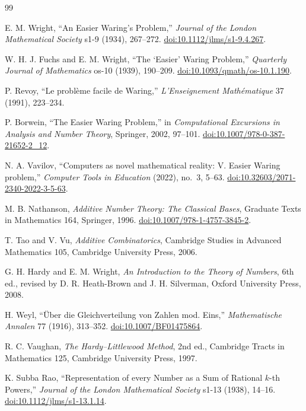 \documentclass[../Axiomathic.tex]{subfiles}
\begin{document}
\begin{thebibliography}{99}

E. M. Wright,
``An Easier Waring's Problem,''
\emph{Journal of the London Mathematical Society} s1-9 (1934), 267--272.
\href{https://doi.org/10.1112/jlms/s1-9.4.267}{doi:10.1112/jlms/s1-9.4.267}.

W. H. J. Fuchs and E. M. Wright,
``The `Easier' Waring Problem,''
\emph{Quarterly Journal of Mathematics} os-10 (1939), 190--209.
\href{https://doi.org/10.1093/qmath/os-10.1.190}{doi:10.1093/qmath/os-10.1.190}.

P. Revoy,
``Le probl\`eme facile de Waring,''
\emph{L'Enseignement Math\'ematique} 37 (1991), 223--234.

P. Borwein,
``The Easier Waring Problem,'' in
\emph{Computational Excursions in Analysis and Number Theory},
Springer, 2002, 97--101.
\href{https://doi.org/10.1007/978-0-387-21652-2_12}{doi:10.1007/978-0-387-21652-2\_12}.

N. A. Vavilov,
``Computers as novel mathematical reality: V. Easier Waring problem,''
\emph{Computer Tools in Education} (2022), no.~3, 5--63.
\href{https://doi.org/10.32603/2071-2340-2022-3-5-63}{doi:10.32603/2071-2340-2022-3-5-63}.

M. B. Nathanson,
\emph{Additive Number Theory: The Classical Bases},
Graduate Texts in Mathematics 164, Springer, 1996.
\href{https://doi.org/10.1007/978-1-4757-3845-2}{doi:10.1007/978-1-4757-3845-2}.

T. Tao and V. Vu,
\emph{Additive Combinatorics},
Cambridge Studies in Advanced Mathematics 105, Cambridge University Press, 2006.

G. H. Hardy and E. M. Wright,
\emph{An Introduction to the Theory of Numbers}, 6th ed.,
revised by D. R. Heath-Brown and J. H. Silverman,
Oxford University Press, 2008.

H. Weyl,
``\"Uber die Gleichverteilung von Zahlen mod. Eins,''
\emph{Mathematische Annalen} 77 (1916), 313--352.
\href{https://doi.org/10.1007/BF01475864}{doi:10.1007/BF01475864}.

R. C. Vaughan,
\emph{The Hardy--Littlewood Method}, 2nd ed.,
Cambridge Tracts in Mathematics 125, Cambridge University Press, 1997.

K. Subba Rao,
``Representation of every Number as a Sum of Rational $k$-th Powers,''
\emph{Journal of the London Mathematical Society} s1-13 (1938), 14--16.
\href{https://doi.org/10.1112/jlms/s1-13.1.14}{doi:10.1112/jlms/s1-13.1.14}.


\end{thebibliography}
\end{document}
